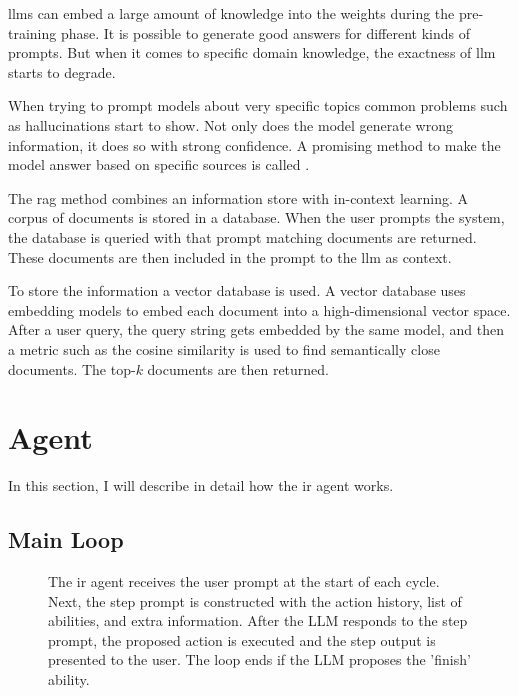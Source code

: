 \documentclass[../main.tex]{subfiles}
\begin{document}
\Glspl{llm} can embed a large amount of knowledge into the weights during the pre-training phase.
It is possible to generate good answers for different kinds of prompts.
But when it comes to specific domain knowledge, the exactness of \gls{llm} starts to degrade.

When trying to prompt models about very specific topics common problems such as hallucinations start to show.
Not only does the model generate wrong information, it does so with strong confidence.
A promising method to make the model answer based on specific sources is called .

The \gls{rag} method combines an information store with in-context learning.
A corpus of documents is stored in a database.
When the user prompts the system, the database is queried with that prompt matching documents are returned.
These documents are then included in the prompt to the \gls{llm} as context.

To store the information a vector database is used.
A vector database uses embedding models to embed each document into a high-dimensional vector space.
After a user query, the query string gets embedded by the same model,
and then a metric such as the cosine similarity is used to find semantically close documents.
The top-$k$ documents are then returned.

\section{Agent}

In this section, I will describe in detail how the \gls{ir} agent works.

\subsection{Main Loop}

\begin{figure}[t]
    \centering
    \caption{The \gls{ir} agent receives the user prompt at the start of each cycle.
        Next, the step prompt is constructed with the action history, list of abilities, and extra information.
        After the LLM responds to the step prompt, the proposed action is executed
        and the step output is presented to the user.
        The loop ends if the LLM proposes the 'finish' ability.}
    \label{fig:agent_loop}
\end{figure}
\end{document}

